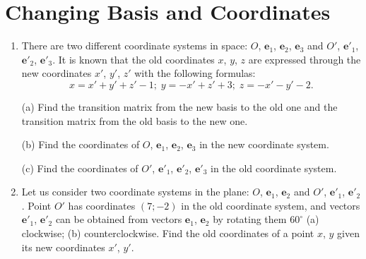 \documentclass[a4paper,10pt]{article}
\begin{document}
\section{Changing Basis and Coordinates}
\begin{enumerate}
\item
There are two different coordinate systems in space: $O$, $\textbf{e}_1$, $\textbf{e}_2$, $\textbf{e}_3$ and $O'$, $\textbf{e}'_1$, $\textbf{e}'_2$, $\textbf{e}'_3$. It is known that the old coordinates $x$, $y$, $z$ are expressed through the new coordinates $x'$, $y'$, $z'$ with the following formulas: $$x=x'+y'+z'-1;\;y=-x'+z'+3;\;z=-x'-y'-2.$$

(a) Find the transition matrix from the new basis to the old one and the transition matrix from the old basis to the new one.

(b) Find the coordinates of $O$, $\textbf{e}_1$, $\textbf{e}_2$, $\textbf{e}_3$ in the new coordinate system.

(c) Find the coordinates of $O'$, $\textbf{e}'_1$, $\textbf{e}'_2$, $\textbf{e}'_3$ in the old coordinate system.
\item
Let us consider two coordinate systems in the plane: $O$, $\textbf{e}_1$, $\textbf{e}_2$ and $O'$, $\textbf{e}'_1$, $\textbf{e}'_2$. Point $O'$ has coordinates $(7;-2)$ in the old coordinate system, and vectors $\textbf{e}'_1$, $\textbf{e}'_2$ can be obtained from vectors $\textbf{e}_1$, $\textbf{e}_2$ by rotating them $60^{\circ}$ (a) clockwise; (b) counterclockwise. Find the old coordinates of a point $x$, $y$ given its new coordinates $x'$, $y'$.


\end{enumerate}
\end{document}

